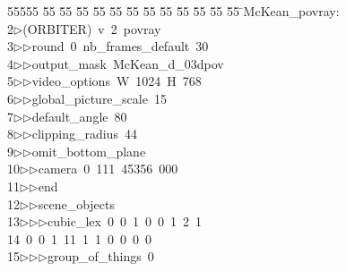 %
%
\begin{tabbing}
55555 \= 55 \= 55 \= 55 \= 55 \= 55 \= 55 \= 55 \= 55 \= 55 \= 55 \= 55 \= 55 \= \>McKean\_povray:\\[0pt]
2\>$\triangleright$\>(ORBITER)\ v\ 2\ povray\ \\[0pt]
3\>$\triangleright$\>$\triangleright$\>round\ 0\ nb\_frames\_default\ 30\ \\[0pt]
4\>$\triangleright$\>$\triangleright$\>output\_mask\ McKean\_d\_03dpov\ \\[0pt]
5\>$\triangleright$\>$\triangleright$\>video\_options\ W\ 1024\ H\ 768\ \\[0pt]
6\>$\triangleright$\>$\triangleright$\>global\_picture\_scale\ 15\ \\[0pt]
7\>$\triangleright$\>$\triangleright$\>default\_angle\ 80\ \\[0pt]
8\>$\triangleright$\>$\triangleright$\>clipping\_radius\ 44\ \\[0pt]
9\>$\triangleright$\>$\triangleright$\>omit\_bottom\_plane\ \\[0pt]
10\>$\triangleright$\>$\triangleright$\>camera\ 0\ 111\ 45356\ 000\ \\[0pt]
11\>$\triangleright$\>$\triangleright$\>end\ \\[0pt]
12\>$\triangleright$\>$\triangleright$\>scene\_objects\ \\[0pt]
13\>$\triangleright$\>$\triangleright$\>$\triangleright$\>cubic\_lex\ 0\ 0\ 1\ 0\ 0\ 1\ 2\ 1\ \\[0pt]
14\ 0\ 0\ 1\ 11\ 1\ 1\ 0\ 0\ 0\ 0\ \\[0pt]
15\>$\triangleright$\>$\triangleright$\>$\triangleright$\>group\_of\_things\ 0\ \\[0pt]

\end{tabbing}
